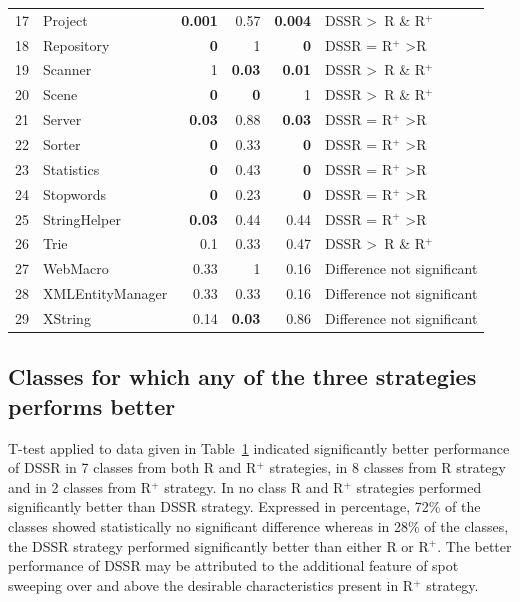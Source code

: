 \begin{table}[htp]
{\begin{tabular}{rlrrrl}
17		&	Project			&	\textbf{0.001}	&0.57			&\textbf{0.004}	& DSSR \textgreater~R \& R$^+$ 				\\		
18		&	Repository		&	\textbf{0}		&1				&\textbf{0}		& DSSR = R$^+$ \textgreater R 		\\
19		&	Scanner			&	1				&\textbf{0.03}	&\textbf{0.01}	& DSSR \textgreater~R \& R$^+$  				\\
20		&	Scene			&	\textbf{0}		&\textbf{0}		& 1				& DSSR \textgreater~R \& R$^+$  				\\
21		&	Server			&	\textbf{0.03}		& 0.88			&\textbf{0.03} 	& DSSR = R$^+$ \textgreater R 		\\
22		&	Sorter			& 	\textbf{0}		& 0.33			&\textbf{0}		& DSSR = R$^+$ \textgreater R 		\\
23		&	Statistics		&	\textbf{0}		& 0.43			&\textbf{0}		& DSSR = R$^+$ \textgreater R 		\\
24		&	Stopwords		&	\textbf{0}		& 0.23			&\textbf{0}		& DSSR = R$^+$ \textgreater R 		\\
25		&	StringHelper		&	\textbf{0.03}		& 0.44			&0.44			& DSSR = R$^+$ \textgreater R 		\\
26		& 	Trie				&	0.1				& 0.33			&0.47			& DSSR \textgreater~R \& R$^+$  				\\
27		&	WebMacro		&	0.33			& 1				&0.16			& Difference not significant		\\
28		&	XMLEntityManager&	0.33			& 0.33			&0.16			& Difference not significant		\\
29 		&	XString			&	0.14			&\textbf{0.03}	&0.86			& Difference not significant		\\


\end{tabular}
}
\bigskip
\label{table:ttest}
\end{table}

\subsection{Classes for which any of the three strategies performs better}

T-test applied to data given in Table~\ref{table:ttest} indicated significantly better performance of DSSR in 7 classes from both R and R$^+$ strategies, in 8 classes from R strategy and in 2 classes from R$^+$ strategy. In no class R and R$^+$ strategies performed significantly better than DSSR strategy. Expressed in percentage, 72\%  of the classes showed statistically no significant difference whereas in 28\% of the classes, the DSSR strategy performed significantly better than either R or R$^+$. The better performance of DSSR may be attributed to the additional feature of spot sweeping over and above the desirable characteristics present in R$^+$ strategy. 


